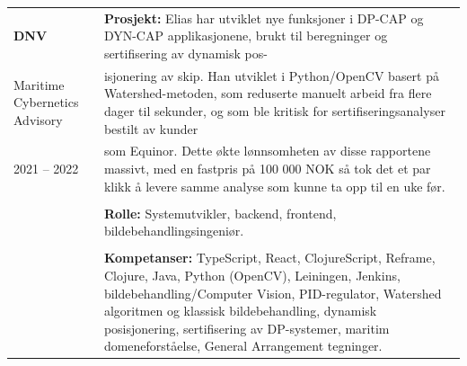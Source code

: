 \documentclass[a4paper,10pt]{article}
\begin{document}
\vspace{2em}

\noindent
\begin{longtable}{@{}p{4cm}p{11cm}@{}}  %
\textbf{DNV} 
& \textbf{Prosjekt:} Elias har utviklet nye funksjoner i DP-CAP og DYN-CAP applikasjonene, brukt til beregninger og sertifisering av dynamisk pos-\\
Maritime Cybernetics Advisory & isjonering av skip. Han utviklet i Python/OpenCV basert på Watershed-metoden, som reduserte manuelt arbeid fra flere dager til sekunder, og som ble kritisk for sertifiseringsanalyser bestilt av kunder\\
2021 -- 2022 & som Equinor. Dette økte lønnsomheten av disse rapportene massivt, med en fastpris på 100 000 NOK så tok det et par klikk å levere samme analyse som kunne ta opp til en uke før. \\
& \\
& \textbf{Rolle:} Systemutvikler, backend, frontend, bildebehandlingsingeniør. \\
& \\
& \textbf{Kompetanser:} TypeScript, React, ClojureScript, Reframe, Clojure, Java, Python (OpenCV), Leiningen, Jenkins, bildebehandling/Computer Vision, PID-regulator, Watershed algoritmen og klassisk bildebehandling, dynamisk posisjonering, sertifisering av DP-systemer, maritim domeneforståelse, General Arrangement tegninger. \\
\end{longtable}


\vspace{2em}
\end{document}
